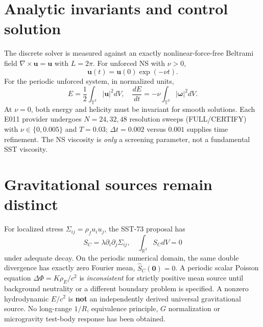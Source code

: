 \documentclass[10pt,a4paper]{article}
\begin{document}
\section{Analytic invariants and control solution}
The discrete solver is measured against an exactly nonlinear-force-free Beltrami field $\nabla\times\mathbf u=\mathbf u$ with $L=2\pi$. For unforced NS with $\nu>0$,
\begin{equation}
\mathbf u(t)=\mathbf u(0)\exp(-\nu t).
\end{equation}
For the periodic unforced system, in normalized units,
\begin{equation}
E=\frac12\int_{\mathbb T^3}|\mathbf u|^2dV,\quad
\frac{dE}{dt}=-\nu\int_{\mathbb T^3}|\boldsymbol\omega|^2dV.
\end{equation}
At $\nu=0$, both energy and helicity must be invariant for smooth solutions. Each E011 provider undergoes $N=24,32,48$ resolution sweeps (FULL/CERTIFY) with $\nu\in\{0,0.005\}$ and $T=0.03$; $\Delta t=0.002$ versus $0.001$ supplies time refinement. The NS viscosity is \emph{only} a screening parameter, not a fundamental SST viscosity.

\section{Gravitational sources remain distinct}
For localized stress $\Sigma_{ij}=\rho_f u_i u_j$, the SST-73 proposal has
\begin{equation}
S_C=\lambda\partial_i\partial_j\Sigma_{ij},\quad
\int_{\mathbb R^3}S_CdV=0
\end{equation}
under adequate decay. On the periodic numerical domain, the same double divergence has exactly zero Fourier mean, $\widehat S_C(\mathbf 0)=0$. A periodic scalar Poisson equation $\Delta\Phi=K\rho_E/c^2$ is \emph{inconsistent} for strictly positive mean source until background neutrality or a different boundary problem is specified. A nonzero hydrodynamic $E/c^2$ is \textbf{not} an independently derived universal gravitational source. No long-range $1/R$, equivalence principle, $G$ normalization or microgravity test-body response has been obtained.
\end{document}

